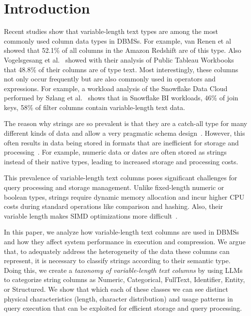 \section{Introduction}
\label{sec:introduction}
Recent studies show that variable-length text types are among the most commonly used column data types in \acp{DBMS}.
For example, van Renen et al~\cite{van_renen_why_2024} showed that 52.1\% of all columns in the
Amazon Redshift are of this type.
Also Vogelsgesang et al.~\cite{vogelsgesang_get_2018} showed with their analysis of Public Tableau
Workbooks that 48.8\% of their columns are of type text.
Most interestingly, these columns not only occur frequently but are also commonly used in operators and expressions.
For example, a workload analysis of the Snowflake Data Cloud performed by Szlang et al.~\cite{szlang_workload_2025}
shows that in Snowflake BI workloads, 46\% of join keys, 58\% of filter columns contain variable-length text data.

The reason why strings are so prevalent is that they are a catch-all type for many
different kinds of data and allow a very pragmatic schema design~\cite{vogelsgesang_get_2018}.
However, this often results in data being stored in formats that are inefficient for storage and processing~\cite{vogelsgesang_get_2018}.
For example, numeric data or dates are often stored as strings instead of their native types, leading to increased storage
and processing costs\cite{vogelsgesang_get_2018}.

This prevalence of variable-length text columns poses significant challenges for query processing and storage management.
Unlike fixed-length numeric or boolean types, strings require dynamic memory allocation and incur higher CPU costs during
standard operations like comparison and hashing.
Also, their variable length makes SIMD optimizations more difficult~\cite{NEEDED}.

In this paper, we analyze how variable-length text columns are used in \acp{DBMS} and how they affect system performance
in execution and compression.
We argue that, to adequately address the heterogeneity of the data these columns can represent, it is necessary to
classify strings according to their semantic type.
Doing this, we create a \textit{taxonomy of variable-length text columns} by using \acp{LLM} to categorize string
columns as Numeric, Categorical, FullText, Identifier, Entity, or Structured.
We show that which each of these classes we can see distinct physical characteristics
(length, character distribution) and usage patterns in query execution that can be exploited for efficient storage and
query processing.


